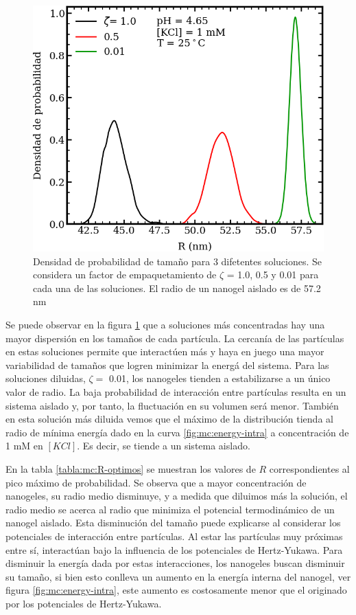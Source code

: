 	\begin{figure}
		\centering
		\includegraphics[width=0.45\linewidth]{Figures/graph-mc/size-zetas.png}
		\caption{Densidad de probabilidad de tama\~no para 3 difetentes soluciones. Se considera un factor de empaquetamiento de $\zeta$ = 1.0, 0.5 y 0.01 para cada una de las soluciones. El radio de un nanogel aislado es de 57.2 nm}
		\label{fig:mc:densidad-probabilidad}
	\end{figure}
	
	Se puede observar en la figura \ref{fig:mc:densidad-probabilidad} que a soluciones m\'as concentradas hay una mayor dispersi\'on en los tama\~nos de cada part\'icula. La cercan\'ia de las part\'iculas en estas soluciones permite que interact\'uen m\'as y haya en juego una mayor variabilidad de tama\~nos que logren minimizar la energ\'a del sistema.
	Para las soluciones diluidas, $\zeta =$ 0.01, los nanogeles tienden a estabilizarse a un \'unico valor de radio. La baja probabilidad de interacción entre part\'iculas resulta en un sistema aislado y, por tanto, la fluctuaci\'on en su volumen ser\'a menor.
	Tambi\'en en esta soluci\'on m\'as diluida vemos que el m\'aximo de la distribuci\'on tienda al radio de m\'inima energ\'ia dado en la curva \ref{fig:mc:energy-intra} a concentración de 1 mM en  $[KCl]$. Es decir, se tiende a un sistema aislado.
	
	En la tabla \ref{tabla:mc:R-optimos} se muestran los valores de $R$ correspondientes al pico m\'aximo de probabilidad. Se observa que a mayor concentraci\'on de nanogeles, su radio medio disminuye, y a medida que diluimos m\'as la soluci\'on, el radio medio se acerca al radio que minimiza el potencial termodin\'amico de un nanogel aislado.
	Esta disminuci\'on del tama\~no puede explicarse al considerar los potenciales de interacci\'on entre part\'iculas. Al estar las part\'iculas muy pr\'oximas entre s\'i, interact\'uan bajo la influencia de los potenciales de Hertz-Yukawa. Para disminuir la energ\'ia dada por estas interacciones, los nanogeles buscan disminuir su tama\~no, si bien esto conlleva un aumento en la energ\'ia interna del nanogel, ver figura \ref{fig:mc:energy-intra}, este aumento es costosamente menor que el originado por los potenciales de Hertz-Yukawa.
	
